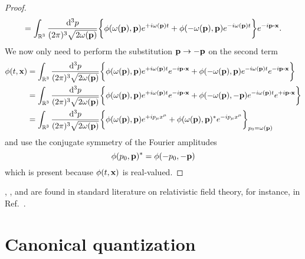 \begin{proof}
\begin{equation*}
		=
		\int_{\mathbb{R}^3}\frac{\dd[3]{p}}{(2\pi)^3\sqrt{2\omega(\vb{p})}}
		\biggl\{
			\phi(\omega(\vb{p}),\vb{p})
			e^{+i\omega(\vb{p})t}
			+
			\phi(-\omega(\vb{p}),\vb{p})
			e^{-i\omega(\vb{p})t}
		\biggr\}
		e^{-i\vb{p}\vdot\vb{x}}
		.
	\end{equation*}
	We now only need to perform the substitution $\vb{p}\to-\vb{p}$ on the second term
	\begin{equation*}
		\begin{split}
			\phi(t,\vb{x})
			&=
			\int_{\mathbb{R}^3}\frac{\dd[3]{p}}{(2\pi)^3\sqrt{2\omega(\vb{p})}}
			\biggl\{
				\phi(\omega(\vb{p}),\vb{p})
				e^{+i\omega(\vb{p})t}
				e^{-i\vb{p}\vdot\vb{x}}
				+
				\phi(-\omega(\vb{p}),\vb{p})
				e^{-i\omega(\vb{p})t}
				e^{-i\vb{p}\vdot\vb{x}}
			\biggr\}
			\\
			&=
			\int_{\mathbb{R}^3}\frac{\dd[3]{p}}{(2\pi)^3\sqrt{2\omega(\vb{p})}}
			\biggl\{
				\phi(\omega(\vb{p}),\vb{p})
				e^{+i\omega(\vb{p})t}
				e^{-i\vb{p}\vdot\vb{x}}
				+
				\phi(-\omega(\vb{p}),-\vb{p})
				e^{-i\omega(\vb{p})t}
				e^{+i\vb{p}\vdot\vb{x}}
			\biggr\}
			\\
			&=
			\int_{\mathbb{R}^3}\frac{\dd[3]{p}}{(2\pi)^3\sqrt{2\omega(\vb{p})}}
			\biggl\{
				\phi(\omega(\vb{p}),\vb{p})
				e^{+ip_\mu x^\mu}
				+
				\phi(\omega(\vb{p}),\vb{p})^*
				e^{-ip_\mu x^\mu}
			\biggr\}_{p_0=\omega(\vb{p})}
		\end{split}
	\end{equation*}
	and use the conjugate symmetry of the Fourier amplitudes
	\begin{equation*}
		\phi(p_0,\vb{p})^*
		=
		\phi(-p_0,-\vb{p})
	\end{equation*}
	which is present because $\phi(t,\vb{x})$ is real-valued.
\end{proof}

, , and  are found in standard literature on relativistic field theory, for instance, in Ref.~\cite{Peskin1995}.

\section{Canonical quantization}

